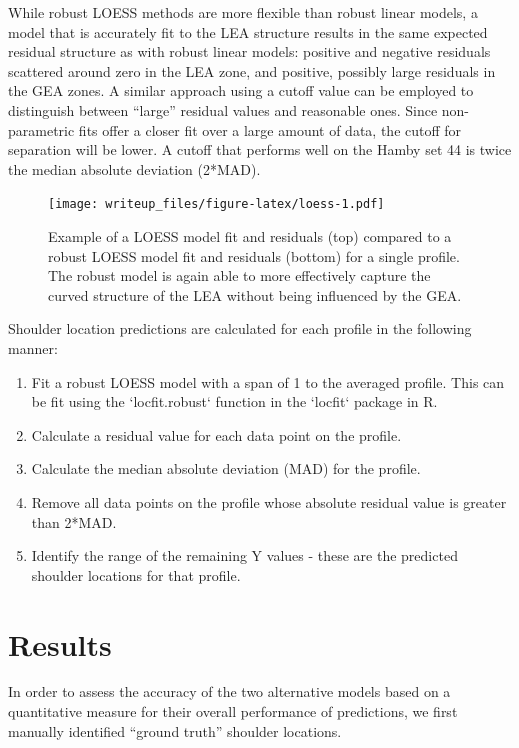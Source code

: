 \documentclass[]{article}
\begin{document}
While robust LOESS methods are more flexible than robust linear models,
a model that is accurately fit to the LEA structure results in the same
expected residual structure as with robust linear models: positive and
negative residuals scattered around zero in the LEA zone, and positive,
possibly large residuals in the GEA zones. A similar approach using a
cutoff value can be employed to distinguish between ``large'' residual
values and reasonable ones. Since non-parametric fits offer a closer fit
over a large amount of data, the cutoff for separation will be lower. A
cutoff that performs well on the Hamby set 44 is twice the median
absolute deviation (2*MAD).

\begin{figure}
\centering
\texttt{[image: writeup\_files/figure-latex/loess-1.pdf]}
\caption{\label{loess}Example of a LOESS model fit and residuals (top)
compared to a robust LOESS model fit and residuals (bottom) for a single
profile. The robust model is again able to more effectively capture the
curved structure of the LEA without being influenced by the GEA.}
\end{figure}

Shoulder location predictions are calculated for each profile in the
following manner:

\begin{enumerate}
\item Fit a robust LOESS model with a span of 1 to the averaged profile. This can be fit using the `locfit.robust` function in the `locfit` package in R.
\item Calculate a residual value for each data point on the profile.  
\item Calculate the median absolute deviation (MAD) for the profile.  
\item Remove all data points on the profile whose absolute residual value is greater than 2*MAD.  
\item Identify the range of the remaining Y values - these are the predicted shoulder locations for that profile.   
\end{enumerate}

\section{Results}

In order to assess the accuracy of the two alternative models based on a
quantitative measure for their overall performance of predictions, we
first manually identified ``ground truth'' shoulder locations.
{\color{orange}{on which data? tie it back to the data section}}
\end{document}
